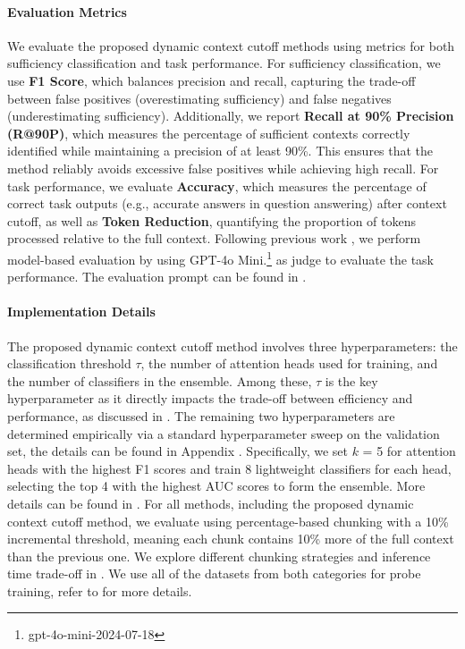 \paragraph{Evaluation Metrics}
We evaluate the proposed dynamic context cutoff methods using metrics for both sufficiency classification and task performance. For sufficiency classification, we use \textbf{F1 Score}, which balances precision and recall, capturing the trade-off between false positives (overestimating sufficiency) and false negatives (underestimating sufficiency). Additionally, we report \textbf{Recall at 90\% Precision (R@90P)}, which measures the percentage of sufficient contexts correctly identified while maintaining a precision of at least 90\%. This ensures that the method reliably avoids excessive false positives while achieving high recall. For task performance, we evaluate \textbf{Accuracy}, which measures the percentage of correct task outputs (e.g., accurate answers in question answering) after context cutoff, as well as \textbf{Token Reduction}, quantifying the proportion of tokens processed relative to the full context. Following previous work \citep{helmet}, we perform model-based evaluation by using GPT-4o Mini.\footnote{gpt-4o-mini-2024-07-18} as judge to evaluate the task performance. The evaluation prompt can be found in .

\paragraph{Implementation Details}
The proposed dynamic context cutoff method involves three hyperparameters: the classification threshold \(\tau\), the number of attention heads used for training, and the number of classifiers in the ensemble. Among these, \(\tau\) is the key hyperparameter as it directly impacts the trade-off between efficiency and performance, as discussed in . The remaining two hyperparameters are determined empirically via a standard hyperparameter sweep on the validation set, the details can be found in Appendix .
Specifically, we set $k$ = 5 for attention heads with the highest F1 scores and train 8 lightweight classifiers for each head, selecting the top 4 with the highest AUC scores to form the ensemble. More details can be found in . For all methods, including the proposed dynamic context cutoff method, we evaluate using percentage-based chunking with a 10\% incremental threshold, meaning each chunk contains 10\% more of the full context than the previous one. We explore different chunking strategies and inference time trade-off in . 
We use all of the datasets from both categories for probe training, refer to  for more details.


